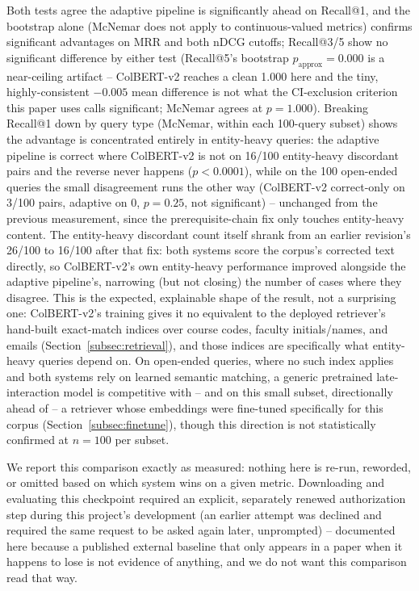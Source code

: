 \documentclass[a4paper,twoside]{article}
\begin{document}
Both tests agree the adaptive pipeline is significantly ahead on Recall@1, and the bootstrap alone (McNemar does not apply to continuous-valued metrics) confirms significant advantages on MRR and both nDCG cutoffs; Recall@3/5 show no significant difference by either test (Recall@5's bootstrap $p_{\text{approx}}=0.000$ is a near-ceiling artifact -- ColBERT-v2 reaches a clean 1.000 here and the tiny, highly-consistent $-0.005$ mean difference is not what the CI-exclusion criterion this paper uses calls significant; McNemar agrees at $p=1.000$). Breaking Recall@1 down by query type (McNemar, within each 100-query subset) shows the advantage is concentrated entirely in entity-heavy queries: the adaptive pipeline is correct where ColBERT-v2 is not on 16/100 entity-heavy discordant pairs and the reverse never happens ($p<0.0001$), while on the 100 open-ended queries the small disagreement runs the other way (ColBERT-v2 correct-only on 3/100 pairs, adaptive on 0, $p=0.25$, not significant) -- unchanged from the previous measurement, since the prerequisite-chain fix only touches entity-heavy content. The entity-heavy discordant count itself shrank from an earlier revision's 26/100 to 16/100 after that fix: both systems score the corpus's corrected text directly, so ColBERT-v2's own entity-heavy performance improved alongside the adaptive pipeline's, narrowing (but not closing) the number of cases where they disagree. This is the expected, explainable shape of the result, not a surprising one: ColBERT-v2's training gives it no equivalent to the deployed retriever's hand-built exact-match indices over course codes, faculty initials/names, and emails (Section~\ref{subsec:retrieval}), and those indices are specifically what entity-heavy queries depend on. On open-ended queries, where no such index applies and both systems rely on learned semantic matching, a generic pretrained late-interaction model is competitive with -- and on this small subset, directionally ahead of -- a retriever whose embeddings were fine-tuned specifically for this corpus (Section~\ref{subsec:finetune}), though this direction is not statistically confirmed at $n=100$ per subset.

We report this comparison exactly as measured: nothing here is re-run, reworded, or omitted based on which system wins on a given metric. Downloading and evaluating this checkpoint required an explicit, separately renewed authorization step during this project's development (an earlier attempt was declined and required the same request to be asked again later, unprompted) -- documented here because a published external baseline that only appears in a paper when it happens to lose is not evidence of anything, and we do not want this comparison read that way.
\end{document}
